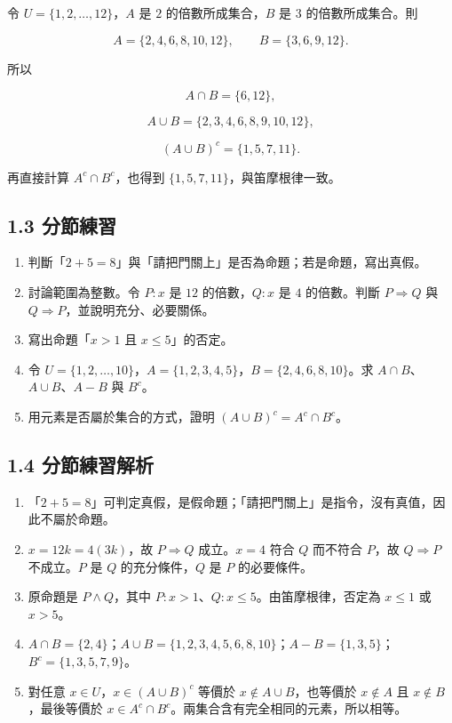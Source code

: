 \documentclass[11pt,a4paper]{article}
\providecommand{\tightlist}{%
  \setlength{\itemsep}{0pt}\setlength{\parskip}{0pt}}
\begin{document}
令 \(U=\{1,2,\ldots,12\}\)，\(A\) 是 \(2\) 的倍數所成集合，\(B\) 是 \(3\) 的倍數所成集合。則

\[
A=\{2,4,6,8,10,12\},\qquad B=\{3,6,9,12\}.
\]

所以

\[
A\cap B=\{6,12\},
\]

\[
A\cup B=\{2,3,4,6,8,9,10,12\},
\]

\[
(A\cup B)^c=\{1,5,7,11\}.
\]

再直接計算 \(A^c\cap B^c\)，也得到 \(\{1,5,7,11\}\)，與笛摩根律一致。

\subsection{1.3 分節練習}\label{ux5206ux7bc0ux7df4ux7fd2}

\begin{enumerate}
\def\labelenumi{\arabic{enumi}.}
\tightlist
\item
  判斷「\(2+5=8\)」與「請把門關上」是否為命題；若是命題，寫出真假。
\item
  討論範圍為整數。令 \(P:x\) 是 \(12\) 的倍數，\(Q:x\) 是 \(4\) 的倍數。判斷 \(P\Rightarrow Q\) 與 \(Q\Rightarrow P\)，並說明充分、必要關係。
\item
  寫出命題「\(x>1\) 且 \(x\le5\)」的否定。
\item
  令 \(U=\{1,2,\ldots,10\}\)，\(A=\{1,2,3,4,5\}\)，\(B=\{2,4,6,8,10\}\)。求 \(A\cap B\)、\(A\cup B\)、\(A-B\) 與 \(B^c\)。
\item
  用元素是否屬於集合的方式，證明 \((A\cup B)^c=A^c\cap B^c\)。
\end{enumerate}

\subsection{1.4 分節練習解析}\label{ux5206ux7bc0ux7df4ux7fd2ux89e3ux6790}

\begin{enumerate}
\def\labelenumi{\arabic{enumi}.}
\tightlist
\item
  「\(2+5=8\)」可判定真假，是假命題；「請把門關上」是指令，沒有真值，因此不屬於命題。
\item
  \(x=12k=4(3k)\)，故 \(P\Rightarrow Q\) 成立。\(x=4\) 符合 \(Q\) 而不符合 \(P\)，故 \(Q\Rightarrow P\) 不成立。\(P\) 是 \(Q\) 的充分條件，\(Q\) 是 \(P\) 的必要條件。
\item
  原命題是 \(P\wedge Q\)，其中 \(P:x>1\)、\(Q:x\le5\)。由笛摩根律，否定為 \(x\le1\) 或 \(x>5\)。
\item
  \(A\cap B=\{2,4\}\)；\(A\cup B=\{1,2,3,4,5,6,8,10\}\)；\(A-B=\{1,3,5\}\)；\(B^c=\{1,3,5,7,9\}\)。
\item
  對任意 \(x\in U\)，\(x\in(A\cup B)^c\) 等價於 \(x\notin A\cup B\)，也等價於 \(x\notin A\) 且 \(x\notin B\)，最後等價於 \(x\in A^c\cap B^c\)。兩集合含有完全相同的元素，所以相等。
\end{enumerate}
\end{document}
